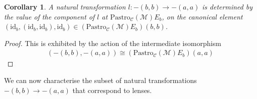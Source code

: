 \documentclass[11pt,a4paper]{amsart}
\theoremstyle{plain}
\newtheorem{corollary}[theorem]{Corollary}
\theoremstyle{definition}
\newcommand{\id}{\mathrm{id}}
\newcommand{\C}{\mathscr{C}}
\newcommand{\M}{\mathscr{M}}
\newcommand{\Pastro}{\mathrm{Pastro}}
\newcommand{\Set}{\mathbf{Set}}
\newcommand{\Tamb}{\mathbf{Tamb}}
\begin{document}
\begin{corollary}
A natural transformation $l : -(b, b) \to -(a, a)$ is determined by the value of the component of $l$ at $\Pastro_\C(\M)E_b$, on the canonical element $(\id_b, (\id_b,\id_b),\id_b) \in (\Pastro_\C(\M)E_b)(b, b)$.
\end{corollary}
\begin{proof}
This is exhibited by the action of the intermediate isomorphism
\begin{align*}
[\Tamb_\C(\M), \Set](-(b, b),-(a, a))
\cong (\Pastro_\C(\M)E_b)(a,a)
\end{align*}
\end{proof}

We can now characterise the subset of natural transformations $-(b, b) \to -(a, a)$ that correspond to lenses.
\end{document}
